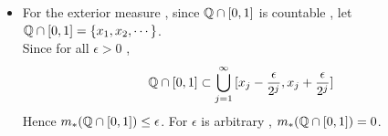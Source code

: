 \begin{defn}
\begin{rmk}
\begin{itemize}
\begin{example}
\begin{itemize}
						\item For the exterior measure , since $\mathbb{Q} \cap [0 , 1]$ is countable , let $\mathbb{Q} \cap [0 , 1]=  \{ x_1 , x_2 , \cdots \}$.\\
						Since for all $\epsilon > 0$ ,
						\begin{align}
							\mathbb{Q} \cap [0 , 1] \subset \bigcup_{j = 1}^{\infty}{[x_j - \frac{\epsilon}{2^j} , x_j + \frac{\epsilon}{2^j}]}
						\end{align}
						Hence $m_{*}(\mathbb{Q} \cap [0 , 1]) \leq \epsilon$. For $\epsilon$ is arbitrary , $m_{*}(\mathbb{Q} \cap [0 , 1]) = 0$.
					\end{itemize}
				\end{example}
			\end{itemize}
		\end{rmk}
	\end{defn}

\newpage
